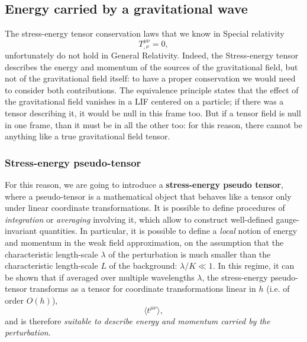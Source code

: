 \subsection{Energy carried by a gravitational wave}
The stress-energy tensor conservation laws that we know in Special relativity
\[
    T^{\mu\nu}_{,\nu}=0,
\]
unfortunately do not hold in General Relativity.
Indeed, the Stress-energy tensor describes the energy and momentum of the sources of the gravitational field, but not of the gravitational field itself: to have a proper conservation we would need to consider both contributions.
The equivalence principle states that the effect of the gravitational field vanishes in a LIF centered on a particle; if there was a tensor describing it, it would be null in this frame too.
But if a tensor field is null in one frame, than it must be in all the other too: for this reason, there cannot be anything like a true gravitational field tensor.

\subsubsection{Stress-energy pseudo-tensor}
For this reason, we are going to introduce a \textbf{stress-energy pseudo tensor}, where a pseudo-tensor is a mathematical object that behaves like a tensor only under linear coordinate transformations.
It is possible to define procedures of \textit{integration} or \textit{averaging} involving it, which allow to construct well-defined gauge-invariant quantities.
In particular, it is possible to define a \textit{local} notion of energy and momentum in the weak field approximation, on the assumption that the characteristic length-scale $\lambda$ of the perturbation is much smaller than the characteristic length-scale $L$ of the background: $\lambda/K\ll 1$.
In this regime, it can be shown that if averaged over multiple wavelengths $\lambda$, the stress-energy pseudo-tensor transforms as a tensor for coordinate transformations linear in $h$ (i.e. of order $O(h)$),
\[
    \langle t^{\mu\nu}\rangle,
\]
and is therefore \textit{suitable to describe energy and momentum carried by the perturbation}.


